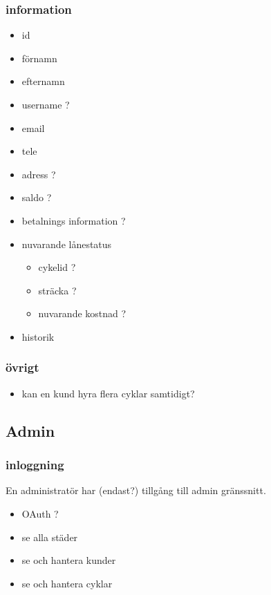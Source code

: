 \documentclass[11pt]{article}
\begin{document}
\subsubsection{information}
\label{sec:orgf43e755}
\begin{itemize}
\item id
\item förnamn
\item efternamn
\item username ?
\item email
\item tele
\item adress ?
\item saldo ?
\item betalnings information ?
\item nuvarande lånestatus
\begin{itemize}
\item cykelid ?
\item sträcka ?
\item nuvarande kostnad ?
\end{itemize}
\item historik
\end{itemize}

\subsubsection{övrigt}
\label{sec:org9c94fa1}
\begin{itemize}
\item kan en kund hyra flera cyklar samtidigt?
\end{itemize}

\subsection{Admin}
\label{sec:org2c285a1}

\subsubsection{inloggning}
\label{sec:orgfc4e12b}
En administratör har (endast?) tillgång till admin gränssnitt.
\begin{itemize}
\item OAuth ?
\item se alla städer
\item se och hantera kunder
\item se och hantera cyklar
\end{itemize}
\end{document}
